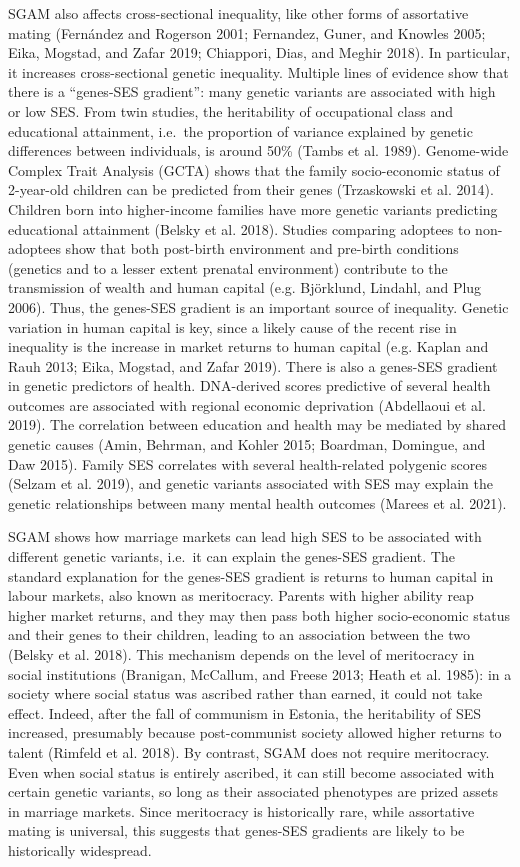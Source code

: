 \documentclass[
  12pt,
]{article}
\theoremstyle{definition}
\theoremstyle{definition}
\theoremstyle{definition}
\theoremstyle{definition}
\theoremstyle{remark}
\begin{document}
SGAM also affects cross-sectional inequality, like other forms of assortative
mating (Fernández and Rogerson 2001; Fernandez, Guner, and Knowles 2005; Eika, Mogstad, and Zafar 2019; Chiappori, Dias, and Meghir 2018). In particular, it increases cross-sectional genetic
inequality. Multiple lines of evidence show that there is a
``genes-SES gradient'': many genetic variants are associated with high or low SES.
From twin studies, the heritability of occupational class and educational
attainment, i.e.~the proportion of variance explained by genetic differences
between individuals, is around 50\% (Tambs et al. 1989). Genome-wide Complex Trait
Analysis (GCTA) shows that the family socio-economic status of 2-year-old
children can be predicted from their genes (Trzaskowski et al. 2014). Children born
into higher-income families have more genetic variants predicting educational
attainment (Belsky et al. 2018). Studies comparing adoptees to non-adoptees show
that both post-birth environment and pre-birth conditions (genetics and to a
lesser extent prenatal environment) contribute to the transmission of wealth and
human capital (e.g. Björklund, Lindahl, and Plug 2006). Thus, the genes-SES gradient is an important source of
inequality. Genetic variation in human capital is key, since a likely cause of
the recent rise in inequality is the increase in market returns to human capital
(e.g. Kaplan and Rauh 2013; Eika, Mogstad, and Zafar 2019). There is also a genes-SES gradient in
genetic predictors of health. DNA-derived scores predictive of several health
outcomes are associated with regional economic deprivation
(Abdellaoui et al. 2019). The correlation between education and health
may be mediated by shared genetic causes (Amin, Behrman, and Kohler 2015; Boardman, Domingue, and Daw 2015). Family SES correlates with several health-related polygenic
scores (Selzam et al. 2019), and genetic variants associated with SES
may explain the genetic relationships between many mental health
outcomes (Marees et al. 2021).

SGAM shows how marriage markets can lead high SES to be associated with
different genetic variants, i.e.~it can explain the genes-SES gradient. The
standard explanation for the genes-SES gradient is returns to human capital
in labour markets, also known as meritocracy. Parents with higher ability reap
higher market returns, and they may then pass both higher socio-economic status
and their genes to their children, leading to an association between the two
(Belsky et al. 2018). This mechanism depends on the level of meritocracy in
social institutions (Branigan, McCallum, and Freese 2013; Heath et al. 1985): in a society where
social status was ascribed rather than earned, it could not take effect. Indeed,
after the fall of communism in Estonia, the heritability of SES increased,
presumably because post-communist society allowed higher returns to talent
(Rimfeld et al. 2018). By contrast, SGAM does not require meritocracy. Even when
social status is entirely ascribed, it can still become associated with certain
genetic variants, so long as their associated phenotypes are prized assets in
marriage markets. Since meritocracy is historically rare, while assortative
mating is universal, this suggests that genes-SES gradients are likely to be
historically widespread.
\end{document}
